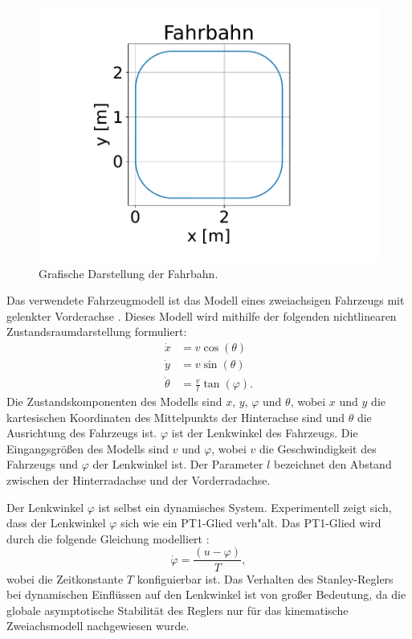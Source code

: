 \documentclass[arbeit=studie,oneside,BCOR=12mm]{ArbeitRST}
\begin{document}
\begin{figure}[h]
    \centering
    \includegraphics[scale=0.5]{fahrbahn}
    \caption{Grafische Darstellung der Fahrbahn.}
    \label{fahrbahn}
\end{figure}


Das verwendete Fahrzeugmodell ist das Modell eines zweiachsigen Fahrzeugs mit
gelenkter Vorderachse \cite{car-model}. Dieses Modell wird mithilfe der folgenden
nichtlinearen Zustandsraumdarstellung formuliert: 
\begin{subequations} \label{eq:model}
    \begin{align}
        \dot{x} &= v \cos(\theta) \\ 
        \dot{y} &= v \sin(\theta) \\ 
        \dot{\theta} &= \frac{v}{l}\tan(\varphi). 
    \end{align}
\end{subequations} 
Die Zustandskomponenten des Modells sind $x$, $y$, $\varphi$ und $\theta$, wobei
$x$ und $y$ die kartesischen Koordinaten des Mittelpunkts der Hinterachse
sind und $\theta$ die Ausrichtung des Fahrzeugs ist. $\varphi$ ist der
Lenkwinkel des Fahrzeugs. Die Eingangsgrößen des Modells sind $v$ und
$\varphi$, wobei $v$ die Geschwindigkeit des Fahrzeugs und $\varphi$ der
Lenkwinkel ist. Der Parameter $l$ bezeichnet den Abstand
zwischen der Hinterradachse und der Vorderradachse.

Der Lenkwinkel $\varphi$ ist selbst ein dynamisches System. Experimentell zeigt sich,
dass der Lenkwinkel $\varphi$ sich wie ein PT1-Glied verh"alt.
Das PT1-Glied wird durch die folgende Gleichung modelliert \cite{pt1glied}:
\begin{equation}
        \dot{\varphi} = \frac{\left(u-\varphi\right)}{T},
\end{equation}
wobei die Zeitkonstante $T$ konfiguierbar ist. Das Verhalten des Stanley-Reglers bei dynamischen Einflüssen auf den Lenkwinkel
ist von großer Bedeutung, da die globale asymptotische Stabilität des Reglers
nur für das kinematische Zweiachsmodell nachgewiesen wurde. \cite{stanley}
\end{document}
